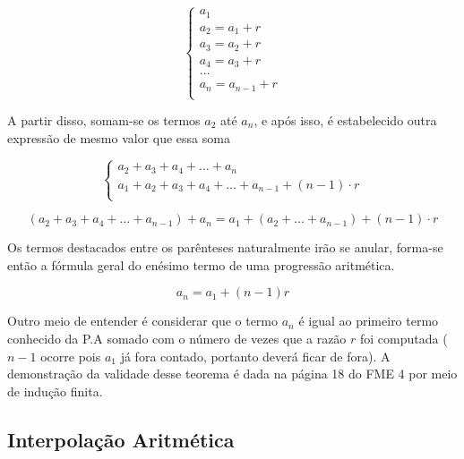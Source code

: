 \begin{tcolorbox}[colback=LightGreen]

\begin{equation*}
\begin{cases}
  a_{1} \\
  a_{2} = a_{1} + r \\
  a_{3} = a_{2} + r \\
  a_{4} = a_{3} + r \\
  \dots \\
  a_{n} = a_{n - 1} + r \\
\end{cases}
\end{equation*}

\end{tcolorbox}

A partir disso, somam-se os termos $a_{2}$ até $a_{n}$, e após isso, é estabelecido outra expressão de mesmo valor que essa soma


\begin{tcolorbox}[colback=LightGreen]
\begin{equation*}
\begin{cases}
  a_{2} + a_{3} + a_{4} + \dots + a_{n} \\
  a_{1} + a_{2} + a_{3} + a_{4} + \dots + a_{n - 1} + (n - 1)\cdot r \\
\end{cases}
\end{equation*}

\[
  (a_{2} + a_{3} + a_{4} + \dots + a_{n - 1}) + a_{n} = a_{1} + (a_{2} + \dots + a_{n-1}) + (n - 1)\cdot r
\]
\end{tcolorbox}

Os termos destacados entre os parênteses naturalmente irão se anular, forma-se então a fórmula geral do enésimo termo de uma progressão aritmética.

\begin{tcolorbox}[colback=LightBlue]
\[a_{n} = a_{1} + (n - 1)r\]
\end{tcolorbox}

Outro meio de entender é considerar que o termo $a_{n}$ é igual ao primeiro termo conhecido da P.A somado com o número de vezes que a razão $r$ foi computada ($n - 1$ ocorre pois $a_{1}$ já fora contado, portanto deverá ficar de fora). A demonstração da validade desse teorema é dada na página 18 do FME 4 por meio de indução finita.

\subsection{Interpolação Aritmética}

